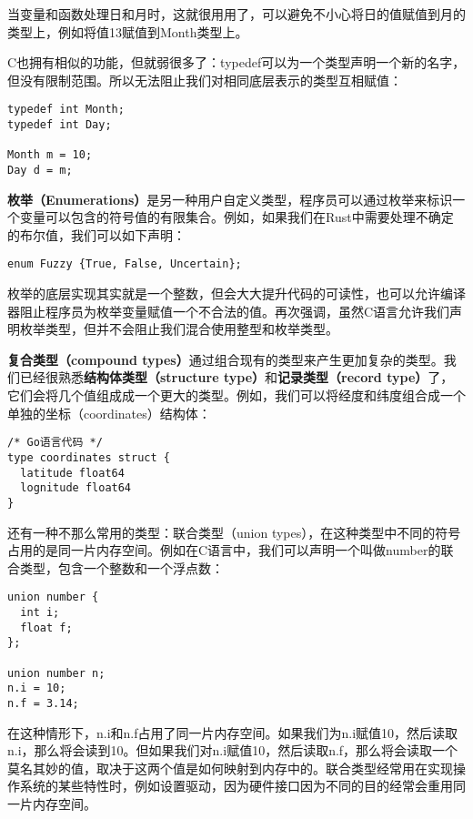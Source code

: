 \documentclass[cn,11pt,chinese]{elegantbook}
\begin{document}
当变量和函数处理日和月时，这就很用用了，可以避免不小心将日的值赋值到月的类型上，例如将值13赋值到Month类型上。

C也拥有相似的功能，但就弱很多了：typedef可以为一个类型声明一个新的名字，但没有限制范围。所以无法阻止我们对相同底层表示的类型互相赋值：

\begin{verbatim}
typedef int Month;
typedef int Day;

Month m = 10;
Day d = m;
\end{verbatim}

\textbf{枚举（Enumerations）}是另一种用户自定义类型，程序员可以通过枚举来标识一个变量可以包含的符号值的有限集合。例如，如果我们在Rust中需要处理不确定的布尔值，我们可以如下声明：

\begin{verbatim}
enum Fuzzy {True, False, Uncertain};
\end{verbatim}

枚举的底层实现其实就是一个整数，但会大大提升代码的可读性，也可以允许编译器阻止程序员为枚举变量赋值一个不合法的值。再次强调，虽然C语言允许我们声明枚举类型，但并不会阻止我们混合使用整型和枚举类型。

\textbf{复合类型（compound types）}通过组合现有的类型来产生更加复杂的类型。我们已经很熟悉\textbf{结构体类型（structure type）}和\textbf{记录类型（record type）}了，它们会将几个值组成成一个更大的类型。例如，我们可以将经度和纬度组合成一个单独的坐标（coordinates）结构体：

\begin{verbatim}
/* Go语言代码 */
type coordinates struct {
  latitude float64
  lognitude float64
}
\end{verbatim}

还有一种不那么常用的类型：联合类型（union types），在这种类型中不同的符号占用的是同一片内存空间。例如在C语言中，我们可以声明一个叫做number的联合类型，包含一个整数和一个浮点数：

\begin{verbatim}
union number {
  int i;
  float f;
};

union number n;
n.i = 10;
n.f = 3.14;
\end{verbatim}

在这种情形下，n.i和n.f占用了同一片内存空间。如果我们为n.i赋值10，然后读取n.i，那么将会读到10。但如果我们对n.i赋值10，然后读取n.f，那么将会读取一个莫名其妙的值，取决于这两个值是如何映射到内存中的。联合类型经常用在实现操作系统的某些特性时，例如设置驱动，因为硬件接口因为不同的目的经常会重用同一片内存空间。
\end{document}
